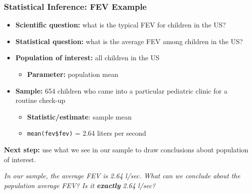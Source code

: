 \documentclass[12pt, 
hyperref={colorlinks=true, linkcolor=blue, urlcolor=cyan}]{beamer}
\begin{document}
\begin{frame}
\frametitle{Statistical Inference: FEV Example} %

\begin{itemize}
\item \textbf{Scientific question:} what is the typical FEV for children in the US? \pause
\item \textbf{Statistical question:} what is the average FEV among children in the US? \pause
\item \textbf{Population of interest:} all children in the US \pause
	\begin{itemize}
	\item \textbf{Parameter:} population mean \pause
	\end{itemize}
\item \textbf{Sample:} 654 children who came into a particular pediatric clinic for a routine check-up \pause
	\begin{itemize}
	\item \textbf{Statistic/estimate}: sample mean 
	\item[]\begin{footnotesize} \texttt{mean(fev\$fev)} = 2.64 liters per second \end{footnotesize}
	\end{itemize}
\end{itemize}

\pause
\vspace{-0.2cm} \textbf{Next step:} use what we see in our sample to draw conclusions about population of interest. \begin{footnotesize}\textit{In our sample, the average FEV is 2.64 l/sec. What can we conclude about the population average FEV? Is it \textbf{exactly} 2.64 l/sec?}\\ \end{footnotesize}

\end{frame}
\end{document}
